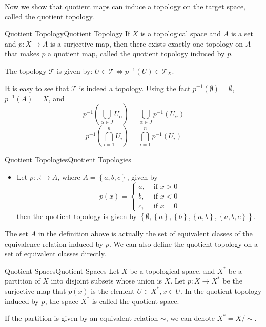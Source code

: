 \documentclass[../main.tex]{subfiles}
\begin{document}
Now we show that quotient maps can induce a topology on the target space, called the quotient topology.

\begin{definition}{Quotient Topology}{Quotient Topology}
If $X$ is a topological space and $A$ is a set and $p:X \rightarrow A$ is a surjective map, then there exists exactly one topology on $A$ that makes $p$ a quotient map, called the quotient topology induced by $p$.

The topology $\mathcal{T}$ is given by: $U \in \mathcal{T} \Leftrightarrow p^{-1}(U) \in \mathcal{T}_X$.
\end{definition}
It is easy to see that $\mathcal{T}$ is indeed a topology. Using the fact $p^{-1}(\emptyset ) = \emptyset $, $p^{-1}(A)=X$, and
\begin{equation*}
	p^{-1}(\bigcup_{\alpha\in J} U_{\alpha}) = \bigcup_{\alpha\in J} p^{-1}(U_{\alpha})
\end{equation*}
\begin{equation*}
	p^{-1}(\bigcap_{i=1}^n U_i) = \bigcap_{i=1}^n p^{-1}(U_i)
\end{equation*}

\begin{example}{Quotient Topologies}{Quotient Topologies}
\begin{itemize}
\item Let $p: \mathbb{R}\rightarrow A$, where $A = \left\{ a,b,c \right\}$, given by
	\begin{equation*}
	p(x) =
	\begin{cases}
		a, &\text{ if } x>0 \\
		b, &\text{ if } x<0 \\
		c, &\text{ if } x=0
	\end{cases}
	\end{equation*}
	then the quotient topology is given by $\left\{ \emptyset ,\left\{ a \right\},\left\{ b \right\},\left\{ a,b \right\},\left\{ a,b,c \right\} \right\}$.
\end{itemize}
\end{example}

The set $A$ in the definition above is actually the set of equivalent classes of the equivalence relation induced by $p$. We can also define the quotient topology on a set of equivalent classes directly.

\begin{definition}{Quotient Spaces}{Quotient Spaces}
Let $X$ be a topological space, and $X^*$ be a partition of $X$ into disjoint subsets whose union is $X$. Let $p: X \rightarrow X^*$ be the surjective map that $p(x)$ is the element $U\in X^*,x\in U$. In the quotient topology induced by $p$, the space $X^*$ is called the quotient space.

If the partition is given by an equivalent relation $\sim$, we can denote $X^* = X / \sim$.
\end{definition}
\end{document}

